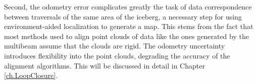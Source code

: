 Second, the odometry error complicates greatly the task of data correspondence between traversals of the same area of the iceberg, a necessary step for using environment-aided localization to generate a map. This stems from the fact that most methods used to align point clouds of data like the ones generated by the multibeam assume that the clouds are rigid. The odometry uncertainty introduces flexibility into the point clouds, degrading the accuracy of the alignment algorithms. This will be discussed in detail in Chapter \ref{ch.LoopClosure}.

%
%
